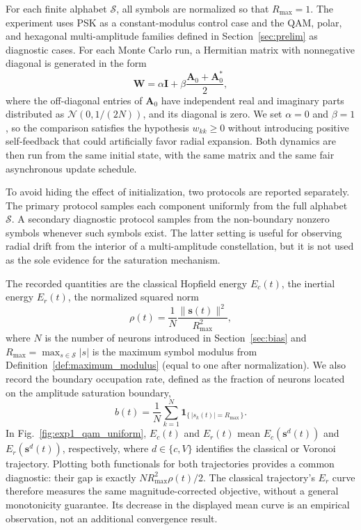 \documentclass[10pt,journal,letterpaper]{IEEEtran}
\begin{document}
For each finite alphabet $\mathcal{S}$, all symbols are normalized so that
$R_{\max}=1$. The experiment uses PSK as a constant-modulus control case and
the QAM, polar, and hexagonal multi-amplitude families defined in
Section~\ref{sec:prelim} as diagnostic cases. For each Monte Carlo run, a
Hermitian matrix with nonnegative
diagonal is generated in the form
\begin{equation}
    \boldsymbol{W}
    = \alpha\boldsymbol{I}
    + \beta\frac{\boldsymbol{A}_0+\boldsymbol{A}_0^*}{2},
\end{equation}
where the off-diagonal entries of $\boldsymbol{A}_0$ have independent real
and imaginary parts distributed as $\mathcal{N}(0,1/(2N))$, and its diagonal
is zero. We set $\alpha=0$ and $\beta=1$, so the
comparison satisfies the hypothesis $w_{kk}\geq 0$ without introducing positive
self-feedback that could artificially favor radial expansion. Both dynamics are
then run from the same initial state, with the same matrix and the same fair
asynchronous update schedule.

To avoid hiding the effect of initialization, two protocols are reported
separately. The primary protocol samples each component uniformly from the full
alphabet $\mathcal{S}$. A secondary diagnostic protocol samples from the
non-boundary nonzero symbols whenever such symbols exist. The latter setting is
useful for observing radial drift from the interior of a multi-amplitude
constellation, but it is not used as the sole evidence for the saturation
mechanism.

The recorded quantities are the classical Hopfield energy $E_c(t)$, the
inertial energy $E_r(t)$, the normalized squared norm
\begin{equation}
    \rho(t)=\frac{1}{N}\frac{\|\boldsymbol{s}(t)\|^2}{R_{\max}^2},
\end{equation}
where $N$ is the number of neurons introduced in Section~\ref{sec:bias}
and $R_{\max}=\max_{s\in\mathcal{S}}|s|$ is the maximum symbol modulus
from Definition~\ref{def:maximum_modulus} (equal to one after normalization). We also record
the boundary occupation rate, defined as the fraction of neurons located on
the amplitude saturation boundary,
\begin{equation}
    b(t)
    = \frac{1}{N}\sum_{k=1}^{N}
      \mathbf{1}_{\{\,|s_k(t)|=R_{\max}\,\}}.
\end{equation}
In Fig.~\ref{fig:exp1_qam_uniform}, $E_c(t)$ and $E_r(t)$ mean
$E_c(\boldsymbol{s}^{d}(t))$ and $E_r(\boldsymbol{s}^{d}(t))$, respectively,
where $d\in\{c,V\}$ identifies the classical or Voronoi trajectory. Plotting
both functionals for both trajectories provides a common diagnostic: their
gap is exactly $N R_{\max}^2\rho(t)/2$. The classical trajectory's $E_r$
curve therefore measures the same magnitude-corrected objective, without a
general monotonicity guarantee. Its decrease in the displayed mean curve is
an empirical observation, not an additional convergence result.
\end{document}
